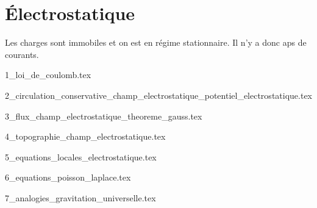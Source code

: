 \chapter{Électrostatique}

Les charges sont immobiles et on est en régime stationnaire. Il n'y a donc aps de courants.

\minitoc

{1_loi_de_coulomb.tex}

{2_circulation_conservative_champ_electrostatique_potentiel_electrostatique.tex}

{3_flux_champ_electrostatique_theoreme_gauss.tex}

{4_topographie_champ_electrostatique.tex}

{5_equations_locales_electrostatique.tex}

{6_equations_poisson_laplace.tex}

{7_analogies_gravitation_universelle.tex}